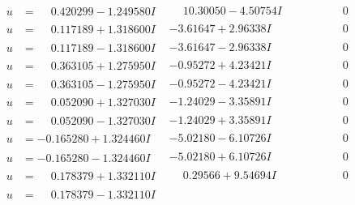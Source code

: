 \documentclass[1p]{elsarticle_modified}
\theoremstyle{definition}
\begin{document}
$$\begin{array}{c|c|c}
 \hline 
\begin{aligned}
u &= \phantom{-}0.420299 - 1.249580 I\end{aligned}
 & \phantom{-}10.30050 - 4.50754 I & \phantom{-0.000000 } 0 \\ \hline\begin{aligned}
u &= \phantom{-}0.117189 + 1.318600 I\end{aligned}
 & -3.61647 + 2.96338 I & \phantom{-0.000000 } 0 \\ \hline\begin{aligned}
u &= \phantom{-}0.117189 - 1.318600 I\end{aligned}
 & -3.61647 - 2.96338 I & \phantom{-0.000000 } 0 \\ \hline\begin{aligned}
u &= \phantom{-}0.363105 + 1.275950 I\end{aligned}
 & -0.95272 + 4.23421 I & \phantom{-0.000000 } 0 \\ \hline\begin{aligned}
u &= \phantom{-}0.363105 - 1.275950 I\end{aligned}
 & -0.95272 - 4.23421 I & \phantom{-0.000000 } 0 \\ \hline\begin{aligned}
u &= \phantom{-}0.052090 + 1.327030 I\end{aligned}
 & -1.24029 - 3.35891 I & \phantom{-0.000000 } 0 \\ \hline\begin{aligned}
u &= \phantom{-}0.052090 - 1.327030 I\end{aligned}
 & -1.24029 + 3.35891 I & \phantom{-0.000000 } 0 \\ \hline\begin{aligned}
u &= -0.165280 + 1.324460 I\end{aligned}
 & -5.02180 - 6.10726 I & \phantom{-0.000000 } 0 \\ \hline\begin{aligned}
u &= -0.165280 - 1.324460 I\end{aligned}
 & -5.02180 + 6.10726 I & \phantom{-0.000000 } 0 \\ \hline\begin{aligned}
u &= \phantom{-}0.178379 + 1.332110 I\end{aligned}
 & \phantom{-}0.29566 + 9.54694 I & \phantom{-0.000000 } 0 \\ \hline\begin{aligned}
u &= \phantom{-}0.178379 - 1.332110 I\end{aligned}

\end{array}$$
\end{document}
